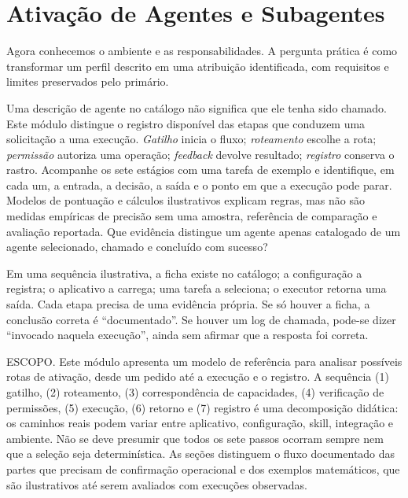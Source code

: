 
\chapter{Ativação de Agentes e Subagentes}

Agora conhecemos o ambiente e as responsabilidades. A pergunta prática é como transformar um perfil descrito em uma atribuição identificada, com requisitos e limites preservados pelo primário.

\label{mod13}

\roteirodidatico
{Uma descrição de agente no catálogo não significa que ele tenha sido chamado. Este módulo distingue o registro disponível das etapas que conduzem uma solicitação a uma execução.}
{\emph{Gatilho} inicia o fluxo; \emph{roteamento} escolhe a rota; \emph{permissão} autoriza uma operação; \emph{feedback} devolve resultado; \emph{registro} conserva o rastro.}
{Acompanhe os sete estágios com uma tarefa de exemplo e identifique, em cada um, a entrada, a decisão, a saída e o ponto em que a execução pode parar.}
{Modelos de pontuação e cálculos ilustrativos explicam regras, mas não são medidas empíricas de precisão sem uma amostra, referência de comparação e avaliação reportada.}
{Que evidência distingue um agente apenas catalogado de um agente selecionado, chamado e concluído com sucesso?}

{Em uma sequência ilustrativa, a ficha existe no catálogo; a configuração a registra; o aplicativo a carrega; uma tarefa a seleciona; o executor retorna uma saída. Cada etapa precisa de uma evidência própria. Se só houver a ficha, a conclusão correta é ``documentado''. Se houver um log de chamada, pode-se dizer ``invocado naquela execução'', ainda sem afirmar que a resposta foi correta.}

\begin{resultado}
ESCOPO. Este módulo apresenta um modelo de referência para analisar possíveis
rotas de ativação, desde um pedido até a execução e o registro. A sequência
(1) gatilho, (2) roteamento, (3) correspondência de capacidades, (4) verificação
de permissões, (5) execução, (6) retorno e (7) registro é uma decomposição
didática: os caminhos reais podem variar entre aplicativo, configuração, skill,
integração e ambiente. Não se deve presumir que todos os sete passos ocorram
sempre nem que a seleção seja determinística. As seções distinguem o fluxo
documentado das partes que precisam de confirmação operacional e dos exemplos
matemáticos, que são ilustrativos até serem avaliados com execuções observadas.
\end{resultado}

